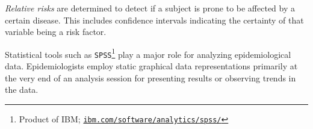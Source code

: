 \documentclass[journal]{style/vgtc} 			          %
\newcommand{\add}[1]{\textcolor{blue}{\uline{#1}}}
\begin{document}
%
\emph{Relative risks} are determined to detect if a subject is prone to be affected by a certain disease.
%
This includes confidence intervals indicating the certainty of that variable being a risk factor.
%
%
%
%
%
%

Statistical tools such as \texttt{SPSS}\footnote{Product of IBM; \href{http://ibm.com/software/analytics/spss/}{\texttt{ibm.com/software/analytics/spss/}}} play a major role for analyzing epidemiological data.
%
Epidemiologists employ static graphical data representations primarily at the very end of an analysis session for presenting results or observing trends in the data.
	
\end{document}
